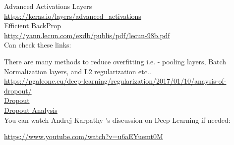 \documentclass[11pt, a4paper]{article}
\begin{document}
Advanced Activations Layers \\
\url{https://keras.io/layers/advanced_activations} \\

Efficient BackProp \\
\url{http://yann.lecun.com/exdb/publis/pdf/lecun-98b.pdf} \\


Can check these links:

There are many methods to reduce overfitting i.e. - pooling layers, Batch Normalization layers, and L2 regularization etc.. \\

\url{https://pgaleone.eu/deep-learning/regularization/2017/01/10/anaysis-of-dropout/} \\

\href{http://machinelearningmastery.com/dropout-regularization-deep-learning-models-keras/}{Dropout}  \\


\href{https://pgaleone.eu/deep-learning/regularization/2017/01/10/anaysis-of-dropout}{Dropout Analysis}  \\




You can watch Andrej Karpathy 's discussion on Deep Learning if needed:

\url{https://www.youtube.com/watch?v=u6aEYuemt0M}
\end{document}
